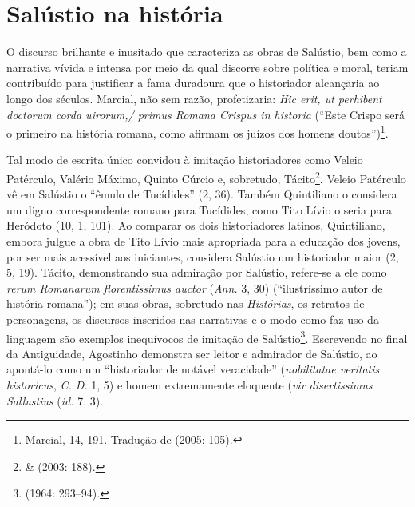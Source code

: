 
\newcommand{\lat}{}%
\newcommand{\old}{\textsc{old}}
\newcommand{\lp}{\textsc{lp}}


\newcommand{\bra}{\selectlanguage{brazilian}{}} 
\newcommand{\ot}{\emph{Orator}\ }



\section{Salústio na história} 

O discurso brilhante e inusitado que caracteriza
as obras de Salústio, bem como a narrativa vívida e intensa por meio da qual
discorre sobre política e moral, teriam contribuído para justificar a fama
duradoura que o historiador alcançaria ao longo dos séculos. Marcial, não sem
razão, profetizaria: \emph{Hic erit, ut perhibent doctorum corda uirorum,/
primus Romana Crispus in historia}  (“Este Crispo será o primeiro na história
romana, como afirmam os juízos dos homens doutos”)\footnote{Marcial, 14, 191.
Tradução de  (2005: 105).}. 

Tal modo de escrita único convidou à imitação historiadores como Veleio
Patérculo, Valério Máximo, Quinto Cúrcio e, sobretudo,
Tácito\footnote{ \&   (2003: 188).}. Veleio
Patérculo vê em Salústio o “êmulo de Tucídides” (2, 36). Também Quintiliano o
considera um digno correspondente romano para Tucídides, como Tito Lívio o
seria para Heródoto (10, 1, 101).  Ao comparar os dois historiadores latinos,
Quintiliano, embora julgue a obra de Tito Lívio mais apropriada para a educação
dos jovens, por ser mais acessível aos iniciantes, considera Salústio um
historiador maior (2, 5, 19).  Tácito, demonstrando sua admiração por Salústio,
refere-se a ele como \lat \emph{rerum Romanarum florentissimus auctor} \bra
(\emph{Ann.} 3, 30) (“ilustríssimo autor de história romana”); em suas obras,
sobretudo nas \emph{Histórias},  os retratos de personagens, os discursos
inseridos nas narrativas e o modo como faz uso da linguagem são exemplos
inequívocos de imitação de Salústio\footnote{ (1964: 293--94).}.
Escrevendo no final da Antiguidade, Agostinho  demonstra ser leitor e admirador
de Salústio, ao apontá-lo como um  “historiador de notável veracidade”
(\emph{nobilitatae veritatis historicus}, \emph{C. D.} 1, 5) e homem
extremamente eloquente (\emph{vir disertissimus Sallustius} (\emph{id.} 7, 3). 

